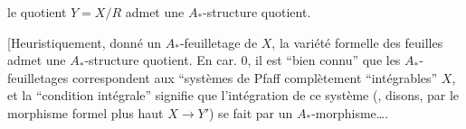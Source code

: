 le quotient  $Y=X/R$ admet une $A_*$-structure quotient.

[Heuristiquement,  donné un $A_*$-feuilletage de $X$, la variété formelle des feuilles admet une $A_*$-structure quotient. En car. 0, il est ``bien connu'' que les $A_*$-feuilletages correspondent aux ``systèmes de Pfaff complètement ``intégrables''  $X$, et la ``condition intégrale'' signifie que l'intégration de ce système (, disons, par le morphisme formel plus haut $X\to Y'$) se fait par un $A_*$-morphisme\ldots.
